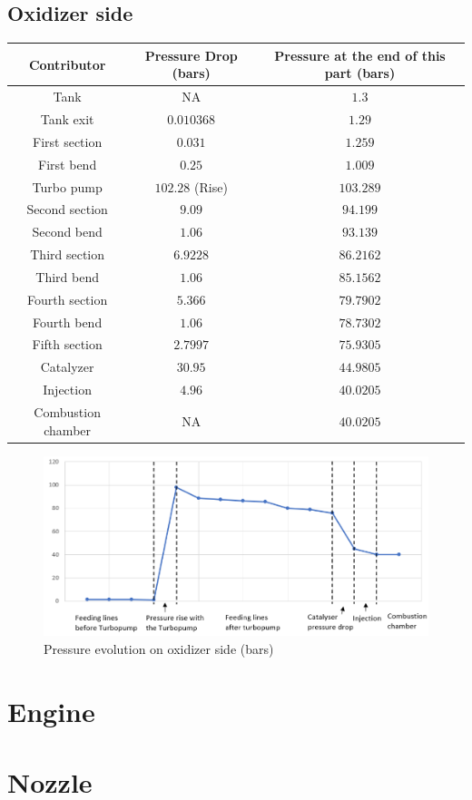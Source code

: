 \subsection{Oxidizer side}
\begin{tabular}[H]{|c|c|c|}
	\hline
	\cellcolor{gray!50}Contributor& \cellcolor{gray!50}Pressure Drop (bars) & \cellcolor{gray!50}Pressure at the end of this part (bars)\\
	\hline
	Tank & NA & $1.3$ \\
	\hline
	Tank exit & $0.010368$ & $1.29$\\
	\hline
	First section & $0.031$ &$1.259$\\
	\hline
	First bend &$0.25$ &$1.009$\\
	\hline
	Turbo pump & $102.28 $ (Rise) &$103.289$\\
	\hline
	Second section &$9.09$ &$94.199$\\
	\hline
	Second bend &$1.06$ &$93.139$\\
	\hline
	Third section &$6.9228$ &$86.2162$\\
	\hline
	Third bend &$1.06$ &$85.1562$\\
	\hline
	Fourth section &$5.366$ &$79.7902$\\
	\hline
	Fourth bend &$1.06$ &$78.7302$\\
	\hline
	Fifth section &$2.7997$ &$75.9305$\\
	\hline
	Catalyzer &$30.95$ &$44.9805$\\
	\hline
	Injection &$4.96$ &$40.0205$\\
	\hline
	Combustion chamber & NA &$40.0205$\\
	\hline
\end{tabular}

\begin{figure}[H]
	\centering
	\includegraphics[width=\linewidth]{oxchart}
	\caption{Pressure evolution on oxidizer side (bars)}
\end{figure}
\section{Engine}
\section{Nozzle}
